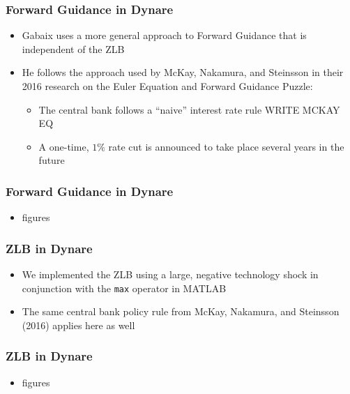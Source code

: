 \documentclass{beamer}
\begin{document}
\begin{frame}
	\frametitle{Forward Guidance in Dynare}
	\begin{itemize}
		\item Gabaix uses a more general approach to Forward Guidance that is independent of the ZLB
		\vspace{8pt}
		\item He follows the approach used by McKay, Nakamura, and Steinsson in their 2016 research on the Euler Equation and Forward Guidance Puzzle:
		\vspace{8pt}
		\begin{itemize}
			\item The central bank follows a ``naive'' interest rate rule WRITE MCKAY EQ
			\item A one-time, $1\%$ rate cut is announced to take place several years in the future
		\end{itemize}
	\end{itemize}
\end{frame}


\begin{frame}
	\frametitle{Forward Guidance in Dynare}
	\begin{itemize}
		\item figures
	\end{itemize}
\end{frame}


\begin{frame}
	\frametitle{ZLB in Dynare}
	\begin{itemize}
		\item We implemented the ZLB using a large, negative technology shock in conjunction with the \texttt{max} operator in MATLAB
		\vspace{8pt}
		\item The same central bank policy rule from McKay, Nakamura, and Steinsson (2016) applies here as well
	\end{itemize}
\end{frame}


\begin{frame}
	\frametitle{ZLB in Dynare}
	\begin{itemize}
		\item figures
	\end{itemize}
\end{frame}
\end{document}
